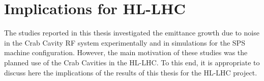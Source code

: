





\section{Implications for HL-LHC}
The studies reported in this thesis investigated the emittance growth due to noise in the Crab Cavity RF system experimentally and in simulations for the SPS machine configuration. However, the main motivation of these studies was the planned use of the Crab Cavities in the HL-LHC. To this end, it is appropriate to discuss here the implications of the results of this thesis for the HL-LHC project. 


